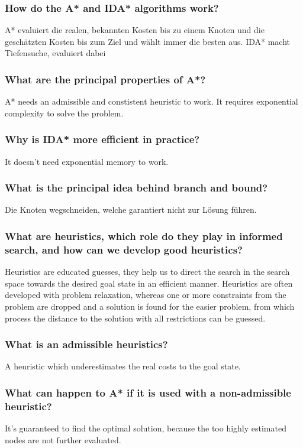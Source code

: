 \subsubsection{How do the A* and IDA* algorithms work?}
A* evaluiert die realen, bekannten Kosten bis zu einem Knoten und die geschätzten Kosten bis zum Ziel und wählt immer die besten aus. IDA* macht Tiefensuche, evaluiert dabei 
\subsubsection{What are the principal properties of A*?}
A* needs an admissible and constistent heuristic to work. It requires exponential complexity to solve the problem. 
\subsubsection{Why is IDA* more efficient in practice?}
It doesn't need exponential memory to work.
\subsubsection{What is the principal idea behind branch and bound?}
Die Knoten wegschneiden, welche garantiert nicht zur Lösung führen.
\subsubsection{What are heuristics, which role do they play in informed search, and how can we develop good heuristics?}
Heuristics are educated guesses, they help us to direct the search in the search space towards the desired goal state in an efficient manner. Heuristics are often developed with problem relaxation, whereas one or more constraints from the problem are dropped and a solution is found for the easier problem, from which process the distance to the solution with all restrictions can be guessed.
\subsubsection{What is an admissible heuristics?}
A heuristic which underestimates the real costs to the goal state.
\subsubsection{What can happen to A* if it is used with a non-admissible heuristic?}
It's guaranteed to find the optimal solution, because the too highly estimated nodes are not further evaluated.